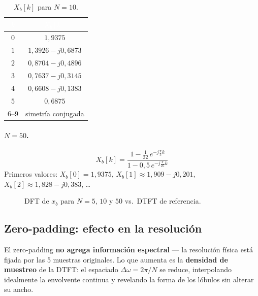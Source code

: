 \documentclass[../Main_Include.tex]{subfiles}
\begin{document}
\begin{table}[H]
\centering
\renewcommand{\arraystretch}{1.4}
\begin{tabular}{cc}
\toprule
\rowcolor{azulprinc}
\textcolor{white}{\textbf{$k$}} &
\textcolor{white}{\textbf{$X_b[k]$}} \\
\midrule
\rowcolor{grisclaro}
$0$ & $1{,}9375$ \\
$1$ & $1{,}3926 - j0{,}6873$ \\
\rowcolor{grisclaro}
$2$ & $0{,}8704 - j0{,}4896$ \\
$3$ & $0{,}7637 - j0{,}3145$ \\
\rowcolor{grisclaro}
$4$ & $0{,}6608 - j0{,}1383$ \\
$5$ & $0{,}6875$ \\
\rowcolor{grisclaro}
$6$--$9$ & simetría conjugada \\
\bottomrule
\end{tabular}
\caption{$X_b[k]$ para $N = 10$.}
\end{table}

\paragraph{$N = 50$.}
\[
    X_b[k] = \frac{1 - \tfrac{1}{32}\,e^{-j\frac{\pi}{5}k}}
                  {1 - 0{,}5\,e^{-j\frac{\pi}{25}k}}
\]
Primeros valores: $X_b[0] = 1{,}9375$, $X_b[1] \approx 1{,}909 - j0{,}201$,
$X_b[2] \approx 1{,}828 - j0{,}383$, \dots

\begin{figure}[H]
    \centering
    \caption{DFT de $x_b$ para $N = 5$, $10$ y $50$ vs.\ DTFT de referencia.}
\end{figure}

\subsection*{Zero-padding: efecto en la resolución}

El zero-padding \textbf{no agrega información espectral} — la resolución
física está fijada por las 5 muestras originales. Lo que aumenta es la
\textbf{densidad de muestreo} de la DTFT: el espaciado
$\Delta\omega = 2\pi/N$ se reduce, interpolando idealmente la envolvente
continua y revelando la forma de los lóbulos sin alterar su ancho.

\end{document}
